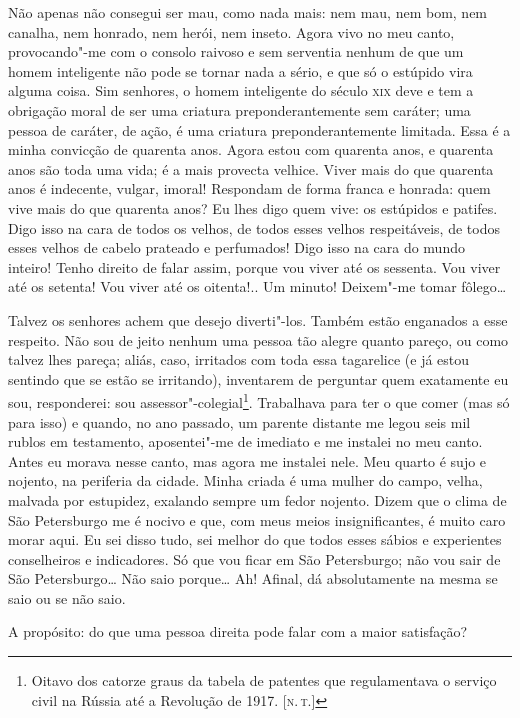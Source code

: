 Não apenas não consegui ser mau, como nada mais: nem mau, nem bom, nem
canalha, nem honrado, nem herói, nem inseto. Agora vivo no meu canto,
provocando"-me com o consolo raivoso e sem serventia nenhum de que um
homem inteligente não pode se tornar nada a sério, e que só o estúpido
vira alguma coisa. Sim senhores, o homem inteligente do século \textsc{xix} deve
e tem a obrigação moral de ser uma criatura preponderantemente sem
caráter; uma pessoa de caráter, de ação, é uma criatura
preponderantemente limitada. Essa é a minha convicção de quarenta anos.
Agora estou com quarenta anos, e quarenta anos são toda uma vida; é a
mais provecta velhice. Viver mais do que quarenta anos é indecente,
vulgar, imoral! Respondam de forma franca e honrada: quem vive mais do
que quarenta anos? Eu lhes digo quem vive: os estúpidos e patifes. Digo
isso na cara de todos os velhos, de todos esses velhos respeitáveis, de
todos esses velhos de cabelo prateado e perfumados! Digo isso na cara do
mundo inteiro! Tenho direito de falar assim, porque vou viver até os
sessenta. Vou viver até os setenta! Vou viver até os oitenta!.. Um
minuto! Deixem"-me tomar fôlego\ldots{}

Talvez os senhores achem que desejo diverti"-los. Também estão enganados
a esse respeito. Não sou de jeito nenhum uma pessoa tão alegre quanto
pareço, ou como talvez lhes pareça; aliás, caso, irritados com toda essa
tagarelice (e já estou sentindo que se estão se irritando), inventarem
de perguntar quem exatamente eu sou, responderei: sou
assessor"-colegial\footnote{Oitavo dos catorze graus da tabela de
  patentes que regulamentava o serviço civil na Rússia até a Revolução
  de 1917. {[}\textsc{n.\,t.}{]}}. Trabalhava para ter o que comer (mas só para
isso) e quando, no ano passado, um parente distante me legou seis mil
rublos em testamento, aposentei"-me de imediato e me instalei no meu
canto. Antes eu morava nesse canto, mas agora me instalei nele. Meu
quarto é sujo e nojento, na periferia da cidade. Minha criada é uma
mulher do campo, velha, malvada por estupidez, exalando sempre um fedor
nojento. Dizem que o clima de São Petersburgo me é nocivo e que, com
meus meios insignificantes, é muito caro morar aqui. Eu sei disso tudo,
sei melhor do que todos esses sábios e experientes conselheiros e
indicadores. Só que vou ficar em São Petersburgo; não vou sair de São
Petersburgo\ldots{} Não saio porque\ldots{} Ah! Afinal, dá absolutamente na mesma
se saio ou se não saio.

A propósito: do que uma pessoa direita pode falar com a maior
satisfação?


